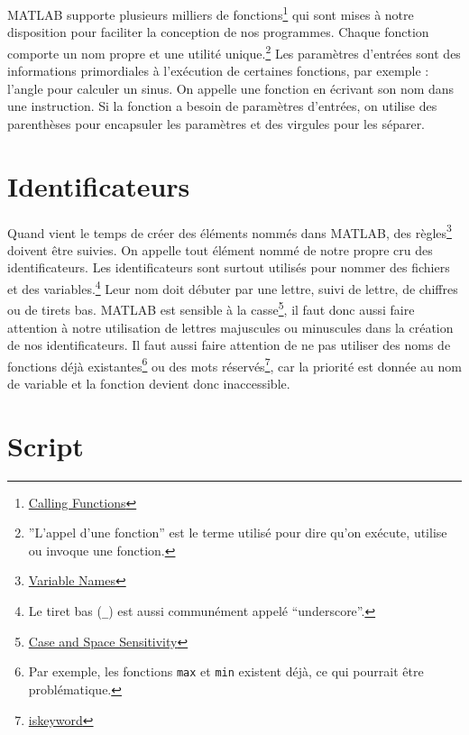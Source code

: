 \documentclass[]{tufte-handout}
\begin{document}
MATLAB supporte plusieurs milliers de fonctions\footnote{\href{https://www.mathworks.com/help/matlab/learn_matlab/calling-functions.html}{Calling
  Functions}} qui sont mises à notre disposition pour faciliter la
conception de nos programmes. Chaque fonction comporte un nom propre et
une utilité unique.\footnote{''L'appel d'une fonction'' est le terme
  utilisé pour dire qu'on exécute, utilise ou invoque une fonction.} Les
paramètres d'entrées sont des informations primordiales à l'exécution de
certaines fonctions, par exemple : l'angle pour calculer un sinus. On
appelle une fonction en écrivant son nom dans une instruction. Si la
fonction a besoin de paramètres d'entrées, on utilise des parenthèses
pour encapsuler les paramètres et des virgules pour les séparer.

\hypertarget{identificateurs}{%
\section{Identificateurs}\label{identificateurs}}

Quand vient le temps de créer des éléments nommés dans MATLAB, des
règles\footnote{\href{https://www.mathworks.com/help/matlab/matlab_prog/variable-names.html}{Variable
  Names}} doivent être suivies. On appelle tout élément nommé de notre
propre cru des identificateurs. Les identificateurs sont surtout
utilisés pour nommer des fichiers et des variables.\footnote{Le tiret
  bas (\texttt{\_}) est aussi communément appelé ``underscore''.} Leur
nom doit débuter par une lettre, suivi de lettre, de chiffres ou de
tirets bas. MATLAB est sensible à la casse\footnote{\href{https://www.mathworks.com/help/matlab/matlab_prog/case-and-space-sensitivity.html}{Case
  and Space Sensitivity}}, il faut donc aussi faire attention à notre
utilisation de lettres majuscules ou minuscules dans la création de nos
identificateurs. Il faut aussi faire attention de ne pas utiliser des
noms de fonctions déjà existantes\footnote{Par exemple, les fonctions
  \texttt{max} et \texttt{min} existent déjà, ce qui pourrait être
  problématique.} ou des mots réservés\footnote{\href{https://www.mathworks.com/help/matlab/ref/iskeyword.html}{iskeyword}},
car la priorité est donnée au nom de variable et la fonction devient
donc inaccessible.

\hypertarget{script}{%
\section{Script}\label{script}}
\end{document}
